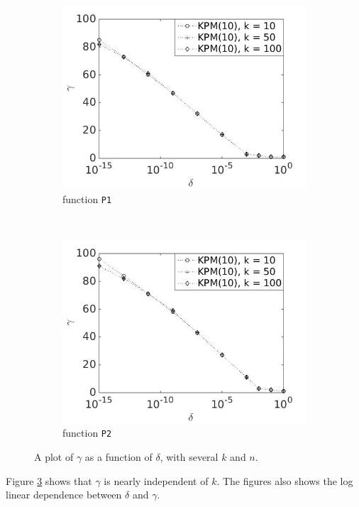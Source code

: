 \begin{figure}[H]
\begin{subfigure}[b]{0.45\textwidth}
                \includegraphics[width=\textwidth]{fig/s20antvstol1k10}
                \caption{function \texttt{P1}}
                \label{fig:gammadeltak3}
        \end{subfigure}
~
        \begin{subfigure}[b]{0.45\textwidth}
                \includegraphics[width=\textwidth]{fig/s21antvstol2k10}
                \caption{ function \texttt{P2}}
                \label{fig:gammadeltak4}
        \end{subfigure}
        \caption{A plot of $\gamma$ as a function of $\delta$, with several $k$ and $n$.} \label{fig:gammadeltak}
\end{figure}
Figure \ref{fig:gammadeltak} shows that $\gamma$ is nearly independent of $k$. The figures also shows the log linear dependence between $\delta$ and $\gamma$. \\



